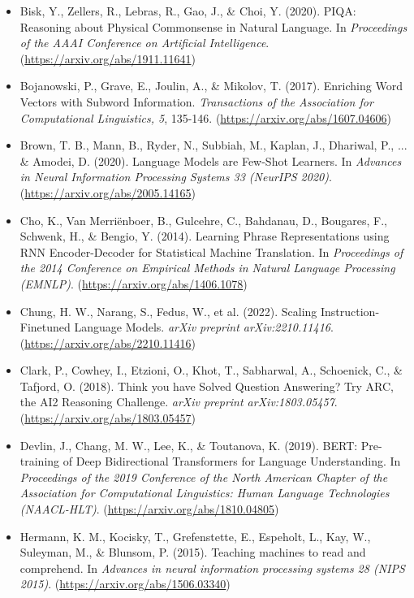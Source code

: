 \documentclass[10.5pt]{article}
\begin{document}
\begin{itemize}
    \item Bisk, Y., Zellers, R., Lebras, R., Gao, J., \& Choi, Y. (2020). PIQA: Reasoning about Physical Commonsense in Natural Language. In \textit{Proceedings of the AAAI Conference on Artificial Intelligence}. (\url{https://arxiv.org/abs/1911.11641})
    \item Bojanowski, P., Grave, E., Joulin, A., \& Mikolov, T. (2017). Enriching Word Vectors with Subword Information. \textit{Transactions of the Association for Computational Linguistics, 5}, 135-146. (\url{https://arxiv.org/abs/1607.04606})
    \item Brown, T. B., Mann, B., Ryder, N., Subbiah, M., Kaplan, J., Dhariwal, P., ... \& Amodei, D. (2020). Language Models are Few-Shot Learners. In \textit{Advances in Neural Information Processing Systems 33 (NeurIPS 2020)}. (\url{https://arxiv.org/abs/2005.14165})
    \item Cho, K., Van Merriënboer, B., Gulcehre, C., Bahdanau, D., Bougares, F., Schwenk, H., \& Bengio, Y. (2014). Learning Phrase Representations using RNN Encoder-Decoder for Statistical Machine Translation. In \textit{Proceedings of the 2014 Conference on Empirical Methods in Natural Language Processing (EMNLP)}. (\url{https://arxiv.org/abs/1406.1078})
    \item Chung, H. W., Narang, S., Fedus, W., et al. (2022). Scaling Instruction-Finetuned Language Models. \textit{arXiv preprint arXiv:2210.11416}. (\url{https://arxiv.org/abs/2210.11416})
    \item Clark, P., Cowhey, I., Etzioni, O., Khot, T., Sabharwal, A., Schoenick, C., \& Tafjord, O. (2018). Think you have Solved Question Answering? Try ARC, the AI2 Reasoning Challenge. \textit{arXiv preprint arXiv:1803.05457}. (\url{https://arxiv.org/abs/1803.05457})
    \item Devlin, J., Chang, M. W., Lee, K., \& Toutanova, K. (2019). BERT: Pre-training of Deep Bidirectional Transformers for Language Understanding. In \textit{Proceedings of the 2019 Conference of the North American Chapter of the Association for Computational Linguistics: Human Language Technologies (NAACL-HLT)}. (\url{https://arxiv.org/abs/1810.04805})
    \item Hermann, K. M., Kocisky, T., Grefenstette, E., Espeholt, L., Kay, W., Suleyman, M., \& Blunsom, P. (2015). Teaching machines to read and comprehend. In \textit{Advances in neural information processing systems 28 (NIPS 2015)}. (\url{https://arxiv.org/abs/1506.03340})

\end{itemize}
\end{document}

